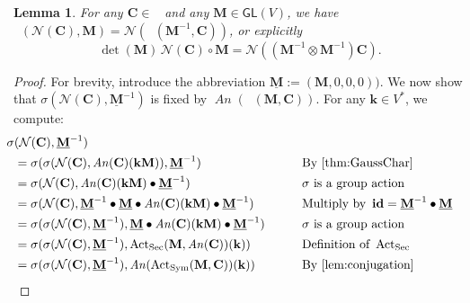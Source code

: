 \documentclass[12pt]{article}
\newcounter{counter}
\theoremstyle{definition}
\theoremstyle{plain}
\newtheorem{lem}[counter]{Lemma}
\newcommand{\Symp}{\mathop{\mathrm{Sym}_2^+}}
\newcommand{\id}{\mathop{\mathbf{id}}\nolimits}
\newcommand{\ActSym}
{\mathop{\mathrm{Act}_{\mathrm{Sym}}}}
\newcommand{\ActSec}
{\mathop{\mathrm{Act}_{\mathrm{Sec}}}}
\newcommand{\ActFun}
{\mathop{\mathrm{Act}_{\mathrm{Fun}}}}
\newcommand{\An}{\mathop{\mathit{An}}}
\begin{document}
\begin{lem}\label{lem:ActGaus}
  For any \(\mathbf{C} \in \Symp\) and any \(\mathbf{M} \in \mathsf{GL}(V)\), we have \(\ActFun (\mathcal{N}(\mathbf{C}), \mathbf{M}) = \mathcal{N}(\ActSym(\mathbf{M}^{-1},\mathbf{C}))\), or explicitly
  \begin{equation} \label{eq:ActGaus}
      \det(\mathbf{M}) \, \mathcal{N}(\mathbf{C}) \circ \mathbf{M} =\mathcal{N}((\mathbf{M}^{-1} \otimes \mathbf{M}^{-1}) \mathbf{C}).
  \end{equation}
\end{lem}

\begin{proof}
    For brevity, introduce the abbreviation \(\underline{\mathbf{M}} := (\mathbf{M}, 0 ,0 ,0))\).  We 
    now show that \(\sigma(\mathcal{N}(\mathbf{C}), \underline{\mathbf{M}}^{-1})\) is fixed by \(\An(\ActSym(\mathbf{M},\mathbf{C}))\).  For any \(\mathbf{k} \in V^*\), we compute:
    \begin{alignat}{3}
        &\hskip -6pt \sigma (\mathcal{N}(\mathbf{C}), \underline{\mathbf{M}}^{-1}) \\
        &= \sigma (\sigma (\mathcal{N}(\mathbf{C}), \An(\mathbf{C})(\mathbf{kM})), \underline{\mathbf{M}}^{-1}) &&\text{By \autoref{thm:GaussChar}} \\
        &= \sigma (\mathcal{N}(\mathbf{C}), \An(\mathbf{C})(\mathbf{kM}) \bullet \underline{\mathbf{M}}^{-1}) &&\sigma \text{ is a group action} \\
        &= \sigma (\mathcal{N}(\mathbf{C}), \underline{\mathbf{M}}^{-1} \bullet \underline{\mathbf{M}} \bullet \An(\mathbf{C})(\mathbf{kM}) \bullet \underline{\mathbf{M}}^{-1}) &&\text{Multiply by }\id = \underline{\mathbf{M}}^{-1} \bullet \underline{\mathbf{M}}\\
        &= \sigma ( \sigma (\mathcal{N}(\mathbf{C}), \underline{\mathbf{M}}^{-1}), \underline{\mathbf{M}} \bullet \An(\mathbf{C})(\mathbf{kM}) \bullet \underline{\mathbf{M}}^{-1})\qquad &&\sigma \text{ is a group action} \\
        &= \sigma ( \sigma (\mathcal{N}(\mathbf{C}), \underline{\mathbf{M}}^{-1}), \ActSec(\mathbf{M},\An(\mathbf{C}))(\mathbf{k})) &&\text{Definition of }\ActSec \\
        &= \sigma ( \sigma (\mathcal{N}(\mathbf{C}), \underline{\mathbf{M}}^{-1}), \An(\ActSym(\mathbf{M},\mathbf{C}))(\mathbf{k})) &&\text{By \autoref{lem:conjugation}}
    \end{alignat}


\end{proof}
\end{document}
